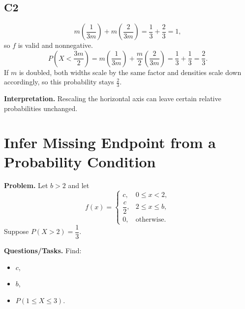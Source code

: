 \subsection*{C2}
\[
m\left(\frac{1}{3m}\right)+m\left(\frac{2}{3m}\right)=\frac{1}{3}+\frac{2}{3}=1,
\]
so $f$ is valid and nonnegative.
\[
P\left(X<\frac{3m}{2}\right)=m\left(\frac{1}{3m}\right)+\frac{m}{2}\left(\frac{2}{3m}\right)=\frac{1}{3}+\frac{1}{3}=\frac{2}{3}.
\]
If $m$ is doubled, both widths scale by the same factor and densities scale down accordingly, so this probability stays $\frac{2}{3}$.
\begin{center}
\end{center}

\textbf{Interpretation.}
Rescaling the horizontal axis can leave certain relative probabilities unchanged.

\section{Infer Missing Endpoint from a Probability Condition}

\textbf{Problem.}
Let $b>2$ and let
\[
f(x)=
\begin{cases}
c, & 0\le x<2,\\
\dfrac{c}{2}, & 2\le x\le b,\\
0, & \text{otherwise.}
\end{cases}
\]
Suppose $P(X>2)=\dfrac{1}{3}$.

\textbf{Questions/Tasks.}
Find:
\begin{itemize}
    \item[(a)] $c$,
    \item[(b)] $b$,
    \item[(c)] $P(1\le X\le 3)$.
\end{itemize}

